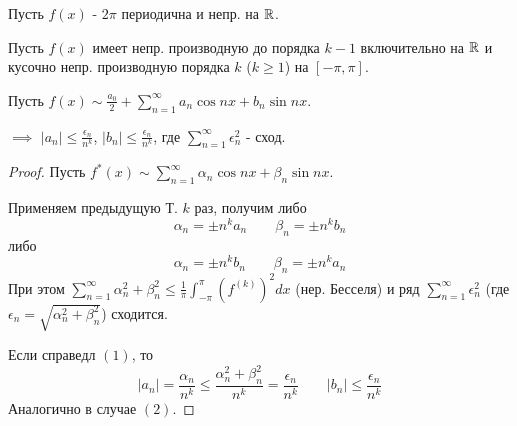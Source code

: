 \documentclass{article}
\begin{document}
\begin{lemma}
  Пусть $f(x)$ - $2\pi$ периодична и непр. на $\mathbb{R}$.

  Пусть $f(x)$ имеет непр. производную до порядка $k-1$ включительно на $\mathbb{R}$
  и кусочно непр. производную порядка $k$ ($k\ge 1$) на $[-\pi,\pi]$.

  Пусть $f(x) \sim \frac{a_0}{2}+\sum_{n=1}^{\infty}a_n\cos nx + b_n \sin nx$.

  $\implies$ $|a_n| \le \frac{\epsilon_n}{n^{k}}$, $|b_n| \le \frac{\epsilon_n}{n^{k}}$,
  где $\sum_{n=1}^{\infty}\epsilon_n^{2}$ - сход.
\end{lemma}
\begin{proof}
  Пусть $f^{*}(x)\sim \sum_{n=1}^{\infty}\alpha_n\cos nx + \beta_n \sin nx$.

  Применяем предыдущую Т. $k$ раз, получим
  либо
  \[
    \alpha_n=\pm n^{k}a_n \qquad
    \beta_n=\pm n^{k} b_n \tag{$1$}
  \]
  либо
  \[
    \alpha_n=\pm n^{k}b_n \qquad
    \beta_n=\pm n^{k} a_n \tag{$2$}
  \]
  При этом $\sum_{n=1}^{\infty}\alpha_n^{2}+\beta_n^{2} \le \frac{1}{\pi}\int_{-\pi}^{\pi}(f^{(k)})^{2}dx$
  (нер. Бесселя) и ряд $\sum_{n=1}^{\infty}\epsilon_n^{2}$ (где $\epsilon_n = \sqrt{\alpha_n^{2}+\beta_n^{2}}$)
  сходится.

  Если справедл $(1)$, то
  \[
    |a_n|=\frac{\alpha_n}{n^{k}} \le \frac{\alpha_n^{2}+\beta_n^{2}}{n^{k}}=\frac{\epsilon_n}{n^{k}} \qquad |b_n| \le \frac{\epsilon_n}{n^{k}}
  \]
  Аналогично в случае $(2)$.
\end{proof}
\end{document}
